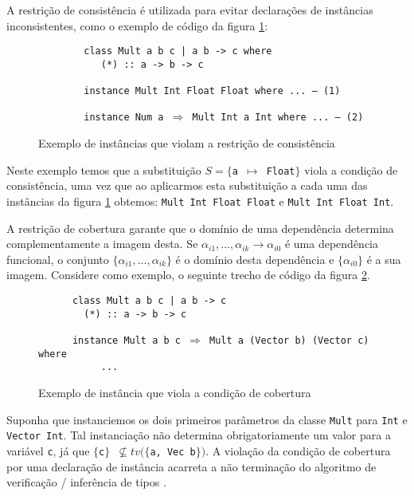 A restri\c{c}\~ao de consist\^encia \'e utilizada para evitar declara\c{c}\~oes de inst\^ancias inconsistentes, 
como o exemplo de c\'odigo da figura \ref{inconsist}:
\begin{figure}[h]
	\begin{flushleft}
\verb|        |\texttt{class Mult a b c | a b -> c where}\\ 
\verb|           |\texttt{(*) :: a -> b -> c}\\
\verb| |\\			
\verb|        |\texttt{instance Mult Int Float Float where ... --- (1)}\\
\verb| |\\		
\verb|        |\texttt{instance Num a $\Rightarrow$ Mult Int a Int where ... --- (2)}\\
	\end{flushleft}
	\centering
	\caption{Exemplo de inst\^ancias que violam a restri\c{c}\~ao de consist\^encia}
	\label{inconsist}
\end{figure} 
Neste exemplo temos que a substitui\c{c}\~ao $S=\{$\texttt{a $\mapsto$ Float}$\}$ viola a condi\c{c}\~ao de 
consist\^encia, uma vez que ao aplicarmos esta substitui\c{c}\~ao a cada uma das inst\^ancias da figura \ref{inconsist}
obtemos: \texttt{Mult Int Float Float} e \texttt{Mult Int Float Int}.

A restri\c{c}\~ao de cobertura garante que o dom\'inio de
uma depend\^encia determina complementamente a imagem desta. Se $\alpha_{i1},...,\alpha_{ik}\rightarrow \alpha_{i0}$ 
\'e uma depend\^encia funcional, o conjunto $\{\alpha_{i1},...,\alpha_{ik}\}$ \'e o dom\'inio desta depend\^encia e 
$\{\alpha_{i0}\}$ \'e a sua imagem. Considere como exemplo, o seguinte trecho de c\'odigo da figura \ref{covering}.

\begin{figure}[h]
	\begin{flushleft}
\verb|	    |\texttt{class Mult a b c | a b -> c}\\
\verb|        |\texttt{(*) :: a -> b -> c}\\
\verb|  |\\   
\verb|	    |\texttt{instance Mult a b c $\Rightarrow$ Mult a (Vector b) (Vector c) where}\\ 
\verb|   	     |\texttt{...}\\
	\end{flushleft}
	\centering
	\caption{Exemplo de inst\^ancia que viola a condi\c{c}\~ao de cobertura}
	\label{covering}
\end{figure}
Suponha que instanciemos os dois primeiros par\^ametros da classe \texttt{Mult} para \texttt{Int} e \texttt{Vector Int}.
Tal instancia\c{c}\~ao n\~ao determina obrigatoriamente um valor para a vari\'avel \texttt{c}, j\'a que 
\texttt{$\{$c$\}$ $\not\subseteq tv(\{$a, Vec b$\})$}. A viola\c{c}\~ao da condi\c{c}\~ao de cobertura por uma 
declara\c{c}\~ao de inst\^ancia acarreta a n\~ao termina\c{c}\~ao do algoritmo de verifica\c{c}\~ao / infer\^encia de 
tipos \cite{Sulzmann06a}.


